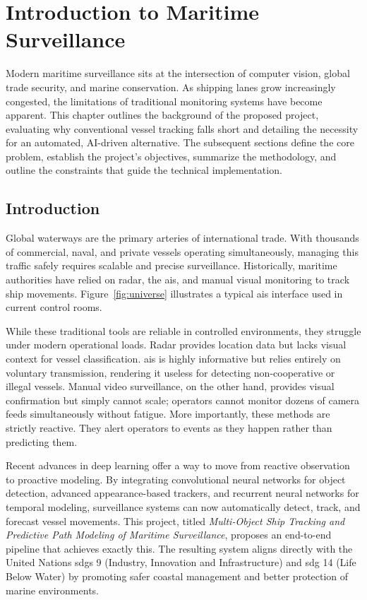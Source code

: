 \chapter{Introduction to Maritime Surveillance}

Modern maritime surveillance sits at the intersection of computer vision, global trade security, and marine conservation. As shipping lanes grow increasingly congested, the limitations of traditional monitoring systems have become apparent. This chapter outlines the background of the proposed project, evaluating why conventional vessel tracking falls short and detailing the necessity for an automated, AI-driven alternative. The subsequent sections define the core problem, establish the project's objectives, summarize the methodology, and outline the constraints that guide the technical implementation.

\section[Introduction]{\textbf{Introduction}}
Global waterways are the primary arteries of international trade. With thousands of commercial, naval, and private vessels operating simultaneously, managing this traffic safely requires scalable and precise surveillance. Historically, maritime authorities have relied on radar, the \gls{ais}, and manual visual monitoring to track ship movements. Figure~\ref{fig:universe} illustrates a typical \gls{ais} interface used in current control rooms.

While these traditional tools are reliable in controlled environments, they struggle under modern operational loads. Radar provides location data but lacks visual context for vessel classification. \gls{ais} is highly informative but relies entirely on voluntary transmission, rendering it useless for detecting non-cooperative or illegal vessels. Manual video surveillance, on the other hand, provides visual confirmation but simply cannot scale; operators cannot monitor dozens of camera feeds simultaneously without fatigue. More importantly, these methods are strictly reactive. They alert operators to events as they happen rather than predicting them.

Recent advances in deep learning offer a way to move from reactive observation to proactive modeling. By integrating convolutional neural networks for object detection, advanced appearance-based trackers, and recurrent neural networks for temporal modeling, surveillance systems can now automatically detect, track, and forecast vessel movements. This project, titled \textit{Multi-Object Ship Tracking and Predictive Path Modeling of Maritime Surveillance}, proposes an end-to-end pipeline that achieves exactly this. The resulting system aligns directly with the United Nations \glspl{sdg} 9 (Industry, Innovation and Infrastructure) and \gls{sdg} 14 (Life Below Water) by promoting safer coastal management and better protection of marine environments.

